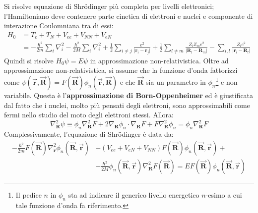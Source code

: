 \documentclass[10pt, a4paper]{scrartcl}
\numberwithin{equation}{subsection}
\theoremstyle{style1}
\theoremstyle{style2}
\begin{document}
Si risolve equazione di Shr\"odinger pi\`u completa per livelli elettronici; l'Hamiltoniano deve contenere parte cinetica di elettroni e nuclei e componente di interazione Coulomniana tra di essi:
\begin{equation}
	\begin{split}
		H_0 &= T_e + T_N + V_{ee} + V_{NN} + V_{eN}   \\
		    &= - \frac{\hbar ^2}{2m} \sum_{i}^{} \nabla _i^2 - \frac{\hbar ^2 }{2M} \sum_{i}^{} \nabla _i^2 + \frac{1}{2} \sum_{i\neq j}^{} \frac{e^2}{\lvert \mathbf{r} _i - \mathbf{r} _j \rvert } + \frac{1}{2}\sum_{l\neq m }^{} \frac{Z_l Z_m e^2 }{\lvert \mathbf{R} _l - \mathbf{R}_m  \rvert } - \sum_{i,l}^{} \frac{Z_l e^2}{\lvert \mathbf{r} _i - \mathbf{R} _l \rvert }
	\end{split}
\end{equation}
Quindi si risolve $H_0 \psi  = E \psi $ in approssimazione non-relativistica.
Oltre ad approssimazione non-relativistica, si assume che la funzione d'onda fattorizzi come $\psi (\vec{\mathbf{r} }, \vec{\mathbf{R} }) = F( \vec{\mathbf{R} }) \phi _n (\vec{\mathbf{r} }, \vec{\mathbf{R} })$ e che $\vec{\mathbf{R} }$ sia un parametro in $\phi _n$\footnote{Il pedice $n$ in $\phi _n$ sta ad indicare il generico livello energetico $n$-esimo a cui tale funzione d'onda fa riferimento.} e non variabile.
Questa \`e l'\textbf{approssimazione di Born-Oppenheimer} ed \`e giustificata dal fatto che i nuclei, molto pi\`u pensati degli elettroni, sono approssimabili come fermi nello studio del moto degli elettroni stessi. Allora:
\begin{equation}
	\nabla ^2 _\mathbf{R} \psi  \equiv \phi _n \nabla ^2 _\mathbf{R} F + 2 \nabla _\mathbf{R} \phi _n \cdot \nabla _\mathbf{R} F + F \nabla ^2_\mathbf{R} \phi _n = \phi _n \nabla ^2_\mathbf{R} F
\end{equation}
Complessivamente, l'equazione di Shr\"odinger \`e data da:
\begin{equation}
	\begin{split}
		-\frac{\hbar ^2}{2m} F( \vec{\mathbf{R} }) \nabla ^2_\mathbf{r} \phi _n (\vec{\mathbf{R} }, \vec{\mathbf{r} }) &+ ( V_{ee}  + V_{eN}+V_{N N} ) F(\vec{\mathbf{R} }) \phi_n (\vec{\mathbf{R} }, \vec{\mathbf{r} }) + \operatorname{} \\
				&- \frac{\hbar ^2}{2M} \phi _n (\vec{\mathbf{R} }, \vec{\mathbf{r} }) \nabla ^2_\mathbf{R} F(\vec{\mathbf{R} })  = E F(\vec{\mathbf{R} }) \phi _n(\vec{\mathbf{R} }, \vec{\mathbf{r} })
	\end{split}
\end{equation}
\end{document}
